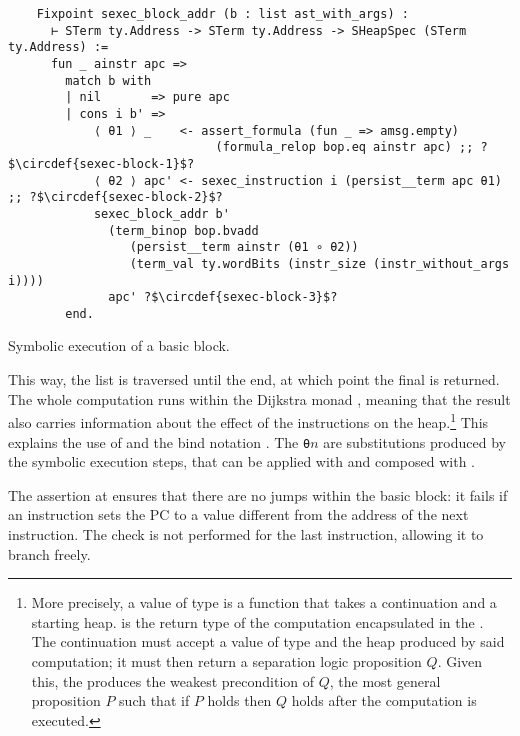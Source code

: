 \begin{listing}[h]
  \startcstep
  \begin{verbatim}
    Fixpoint sexec_block_addr (b : list ast_with_args) :
      ⊢ STerm ty.Address -> STerm ty.Address -> SHeapSpec (STerm ty.Address) :=
      fun _ ainstr apc =>
        match b with
        | nil       => pure apc
        | cons i b' =>
            ⟨ θ1 ⟩ _    <- assert_formula (fun _ => amsg.empty)
                             (formula_relop bop.eq ainstr apc) ;; ?$\circdef{sexec-block-1}$?
            ⟨ θ2 ⟩ apc' <- sexec_instruction i (persist__term apc θ1) ;; ?$\circdef{sexec-block-2}$?
            sexec_block_addr b'
              (term_binop bop.bvadd
                 (persist__term ainstr (θ1 ∘ θ2))
                 (term_val ty.wordBits (instr_size (instr_without_args i))))
              apc' ?$\circdef{sexec-block-3}$?
        end.
  \end{verbatim}
  \caption{Symbolic execution of a basic block.}
  \label{lst:sexec-block}
\end{listing}

This way, the list is traversed until the end, at which point the final  is returned. The whole computation runs within the Dijkstra monad  \cite{Keuchel2022}, meaning that the result also carries information about the effect of the instructions on the heap.\footnote{More precisely, a value of type  is a function that takes a continuation and a starting heap.  is the return type of the computation encapsulated in the . The continuation must accept a value of type  and the heap produced by said computation; it must then return a separation logic proposition \(Q\). Given this, the  produces the weakest precondition of \(Q\), \ie the most general proposition \(P\) such that if \(P\) holds then \(Q\) holds after the computation is executed.} This explains the use of  and the bind notation . The \texttt{θ}\(n\) are substitutions produced by the symbolic execution steps, that can be applied with  and composed with .

The assertion at  ensures that there are no jumps within the basic block: it fails if an instruction sets the PC to a value different from the address of the next instruction. The check is not performed for the last instruction, allowing it to branch freely.


